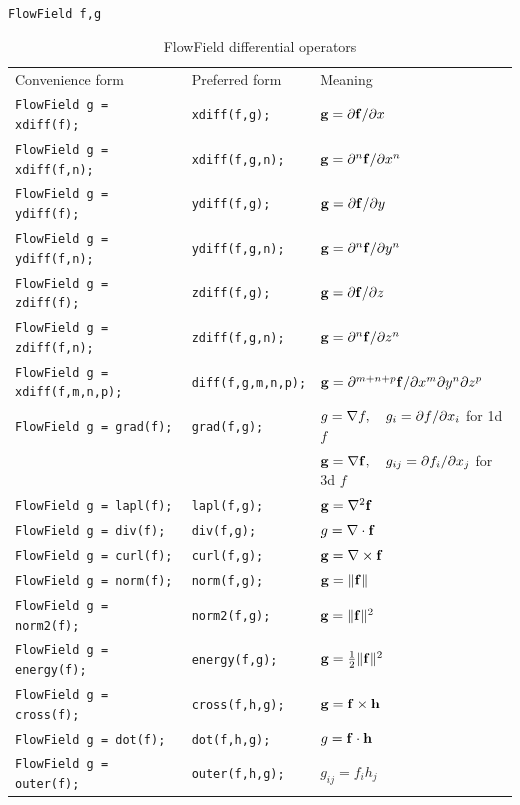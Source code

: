 \documentclass{article}[12pt]
\begin{document}
{\tt FlowField f,g}
\begin{table}
\centering
\caption{FlowField differential operators}
\begin{tabular}{lll}
Convenience form & Preferred form  & Meaning \\
{\tt FlowField g = xdiff(f);} & {\tt xdiff(f,g);}    & ${\bf g} = \partial {\bf f} / \partial x$ \\
{\tt FlowField g = xdiff(f,n);} &{\tt xdiff(f,g,n);}  & ${\bf g} = \partial^n {\bf f} / \partial x^n$ \\
{\tt FlowField g = ydiff(f);} &{\tt ydiff(f,g);}    & ${\bf g} = \partial {\bf f} / \partial y$ \\
{\tt FlowField g = ydiff(f,n);} &{\tt ydiff(f,g,n);}  & ${\bf g} = \partial^n {\bf f} / \partial y^n$ \\
{\tt FlowField g = zdiff(f);} &{\tt zdiff(f,g);}    & ${\bf g} = \partial {\bf f} / \partial z$ \\
{\tt FlowField g = zdiff(f,n);} &{\tt zdiff(f,g,n);}  & ${\bf g} = \partial^n {\bf f} / \partial z^n$ \\
{\tt FlowField g = xdiff(f,m,n,p);} &{\tt diff(f,g,m,n,p);}  & ${\bf g} = \partial^{m+n+p} {\bf f} / \partial x^{m} \partial y^{n} \partial z^{p} $ \\
{\tt FlowField g = grad(f);} & {\tt grad(f,g);}  &  $g = {\bf \nabla} f, \quad g_i = \partial f / \partial x_i$ for 1d $f$ \\
&                  &   ${\bf g} = {\bf \nabla} {\bf f}, \quad g_{ij} = \partial f_i / \partial x_j$ for 3d $f$ \\
{\tt FlowField g = lapl(f);} &{\tt lapl(f,g);}  &   ${\bf g} = \nabla^2 {\bf f}$\\
{\tt FlowField g = div(f);} &{\tt div(f,g);}   &   $g = \nabla \cdot  {\bf f}$\\
{\tt FlowField g = curl(f);} &{\tt curl(f,g);}  &   ${\bf g} = \nabla \times {\bf f}$\\
{\tt FlowField g = norm(f);} &{\tt norm(f,g);}  &   ${\bf g} = \| {\bf f} \|$\\
{\tt FlowField g = norm2(f);} &{\tt norm2(f,g);}  &   ${\bf g} = \| {\bf f}\|^2$\\
{\tt FlowField g = energy(f);} &{\tt energy(f,g);} &  ${\bf g} = \frac{1}{2} \| {\bf f}\|^2$\\
{\tt FlowField g = cross(f);} &{\tt cross(f,h,g);} & ${\bf g} = {\bf f} \times {\bf h}$\\
{\tt FlowField g = dot(f);} &{\tt dot(f,h,g);} &   $g = {\bf f} \cdot {\bf h}$\\
{\tt FlowField g = outer(f);} &{\tt outer(f,h,g);} & $g_{ij} = f_i h_j $
\end{tabular}
\end{table}
\end{document}
